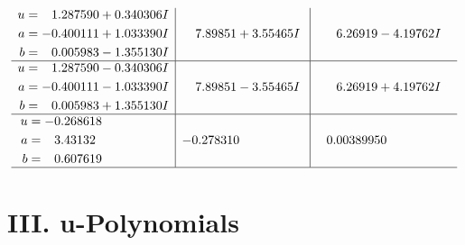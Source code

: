 \documentclass[1p]{elsarticle_modified}
\theoremstyle{definition}
\begin{document}
$$\begin{array}{c|c|c}
\begin{aligned}
u &= \phantom{-}1.287590 + 0.340306 I \\
a &= -0.400111 + 1.033390 I \\
b &= \phantom{-}0.005983 - 1.355130 I\end{aligned}
 & \phantom{-}7.89851 + 3.55465 I & \phantom{-}6.26919 - 4.19762 I \\ \hline\begin{aligned}
u &= \phantom{-}1.287590 - 0.340306 I \\
a &= -0.400111 - 1.033390 I \\
b &= \phantom{-}0.005983 + 1.355130 I\end{aligned}
 & \phantom{-}7.89851 - 3.55465 I & \phantom{-}6.26919 + 4.19762 I \\ \hline\begin{aligned}
u &= -0.268618\phantom{ +0.000000I} \\
a &= \phantom{-}3.43132\phantom{ +0.000000I} \\
b &= \phantom{-}0.607619\phantom{ +0.000000I}\end{aligned}
 & -0.278310\phantom{ +0.000000I} & \phantom{-}0.00389950\phantom{ +0.000000I}\\
 \hline 
 \end{array}$$\newpage
\newpage\renewcommand{\arraystretch}{1}
\centering \section*{ III. u-Polynomials}
\end{document}
